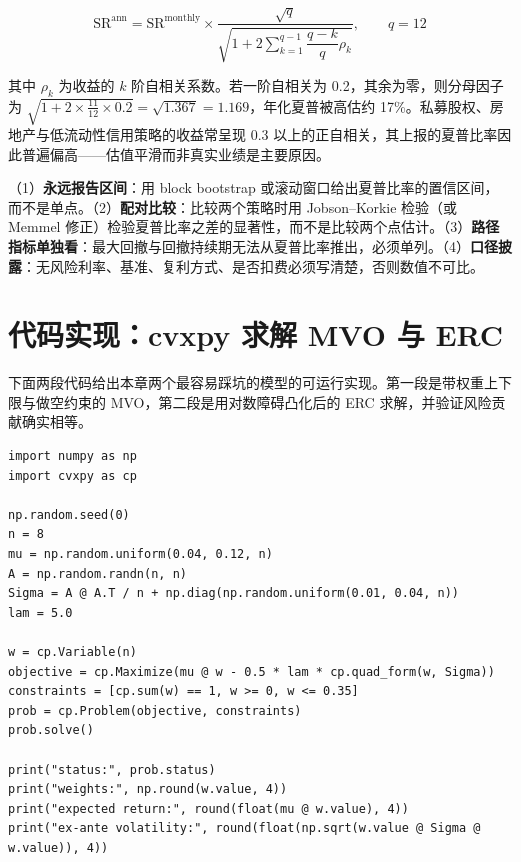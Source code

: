 \begin{equation}\label{eq:11-lo}
  \text{SR}^{\text{ann}} = \text{SR}^{\text{monthly}}\times\frac{\sqrt{q}}
  {\sqrt{1 + 2\sum_{k=1}^{q-1}\dfrac{q-k}{q}\rho_k}},
  \qquad q = 12
\end{equation}

其中 $\rho_k$ 为收益的 $k$ 阶自相关系数。若一阶自相关为 0.2，其余为零，则分母因子为 $\sqrt{1 + 2\times\frac{11}{12}\times 0.2} = \sqrt{1.367} = 1.169$，年化夏普被高估约 17\%。私募股权、房地产与低流动性信用策略的收益常呈现 0.3 以上的正自相关，其上报的夏普比率因此普遍偏高——估值平滑而非真实业绩是主要原因。

\begin{appbox}[指标使用的工程建议]
（1）\textbf{永远报告区间}：用 block bootstrap 或滚动窗口给出夏普比率的置信区间，而不是单点。（2）\textbf{配对比较}：比较两个策略时用 Jobson--Korkie 检验（或 Memmel 修正）检验夏普比率之差的显著性，而不是比较两个点估计。（3）\textbf{路径指标单独看}：最大回撤与回撤持续期无法从夏普比率推出，必须单列。（4）\textbf{口径披露}：无风险利率、基准、复利方式、是否扣费必须写清楚，否则数值不可比。
\end{appbox}

\section{代码实现：cvxpy 求解 MVO 与 ERC}

下面两段代码给出本章两个最容易踩坑的模型的可运行实现。第一段是带权重上下限与做空约束的 MVO，第二段是用对数障碍凸化后的 ERC 求解，并验证风险贡献确实相等。

\begin{lstlisting}[style=pythonstyle,
                   caption={用 cvxpy 求解带约束的均值-方差优化（MVO）},
                   label={lst:11-mvo}]
import numpy as np
import cvxpy as cp

np.random.seed(0)
n = 8
mu = np.random.uniform(0.04, 0.12, n)
A = np.random.randn(n, n)
Sigma = A @ A.T / n + np.diag(np.random.uniform(0.01, 0.04, n))
lam = 5.0

w = cp.Variable(n)
objective = cp.Maximize(mu @ w - 0.5 * lam * cp.quad_form(w, Sigma))
constraints = [cp.sum(w) == 1, w >= 0, w <= 0.35]
prob = cp.Problem(objective, constraints)
prob.solve()

print("status:", prob.status)
print("weights:", np.round(w.value, 4))
print("expected return:", round(float(mu @ w.value), 4))
print("ex-ante volatility:", round(float(np.sqrt(w.value @ Sigma @ w.value)), 4))
\end{lstlisting}

